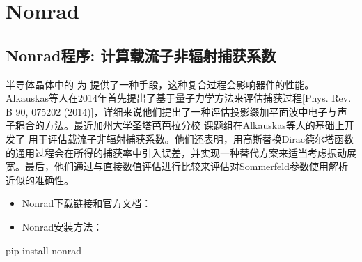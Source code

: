 \documentclass[a4paper,12pt,english]{sphinxmanual}
\begin{document}
\section{Nonrad}
\label{\detokenize{code:nonrad}}

\subsection{Nonrad程序: 计算载流子非辐射捕获系数}
\label{\detokenize{code/Nonrad:nonrad}}\label{\detokenize{code/Nonrad::doc}}
\sphinxAtStartPar
{}

\sphinxAtStartPar
半导体晶体中的  为  提供了一种手段，这种复合过程会影响器件的性能。Alkauskas等人在2014年首先提出了基于量子力学方法来评估捕获过程{[}Phys. Rev. B 90, 075202 (2014){]}，详细来说他们提出了一种评估投影缀加平面波中电子与声子耦合的方法。最近加州大学圣塔芭芭拉分校  课题组在Alkauskas等人的基础上开发了  用于评估载流子非辐射捕获系数。他们还表明，用高斯替换Dirac德尔塔函数的通用过程会在所得的捕获率中引入误差，并实现一种替代方案来适当考虑振动展宽。最后，他们通过与直接数值评估进行比较来评估对Sommerfeld参数使用解析近似的准确性。
\begin{itemize}
\item {} 
\sphinxAtStartPar
Nonrad下载链接和官方文档：

\end{itemize}

\sphinxAtStartPar
{}%
\begin{footnote}[3]\sphinxAtStartFootnote
{}
%
\end{footnote}

\sphinxAtStartPar
{}%
\begin{footnote}[4]\sphinxAtStartFootnote
{}
%
\end{footnote}
\begin{itemize}
\item {} 
\sphinxAtStartPar
Nonrad安装方法：

\end{itemize}

\begin{sphinxVerbatim}[commandchars=\\\{\}]
pip install nonrad
\end{sphinxVerbatim}
\end{document}
